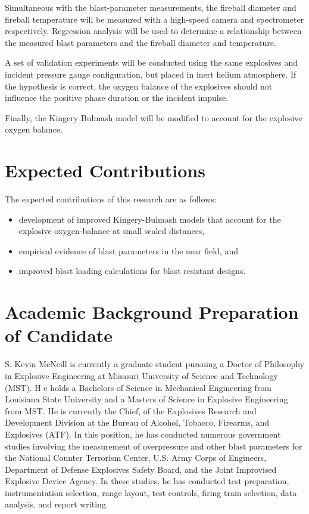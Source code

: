 Simultaneous with the blast-parameter measurements, the fireball diameter and fireball temperature will be measured with a high-speed camera and spectrometer respectively.  Regression analysis will be used to determine a relationship between the measured blast parameters and the fireball diameter and temperature.

A set of validation experiments will be conducted using the same explosives and incident pressure gauge configuration, but placed in inert helium atmosphere.  If the hypothesis is correct, the oxygen balance of the explosives should not influence the positive phase duration or the incident impulse.

Finally, the Kingery Bulmash model will be modified to account for the explosive oxygen balance.
\section{Expected Contributions}
The expected contributions of this research are as follows:
\begin{itemize}
    \item development of improved Kingery-Bulmash models that account for the explosive oxygen-balance at small scaled distances,
    \item empirical evidence of blast parameters in the near field, and
    \item improved blast loading calculations for blast resistant designs.
\end{itemize}
\section{Academic Background Preparation of Candidate}
S. Kevin McNeill is currently a graduate student pursuing a Doctor of Philosophy in Explosive Engineering at Missouri University of Science and Technology (MST). H	e holds a Bachelors of Science in Mechanical Engineering from Louisiana State University and a Masters of Science in Explosive Engineering from MST. He is currently the Chief, of the Explosives Research and Development Division at the Bureau of Alcohol, Tobacco, Firearms, and Explosives (ATF).  In this position, he has conducted numerous government studies involving the measurement of overpressure and other blast parameters for the National Counter Terrorism Center, U.S. Army Corps of Engineers, Department of Defense Explosives Safety Board, and the Joint Improvised Explosive Device Agency.  In these studies, he has conducted test preparation, instrumentation selection, range layout, test controls, firing train selection, data analysis, and report writing.
